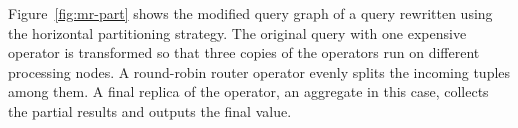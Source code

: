 Figure~\ref{fig:mr-part} shows the modified query graph of a query rewritten using the
horizontal partitioning strategy. The original query with one expensive operator is transformed so that
three copies of the operators run on different processing nodes. A round-robin router operator evenly
splits the incoming tuples among them. A final replica of the operator, an aggregate in this case,
collects the partial results and outputs the final value. 

